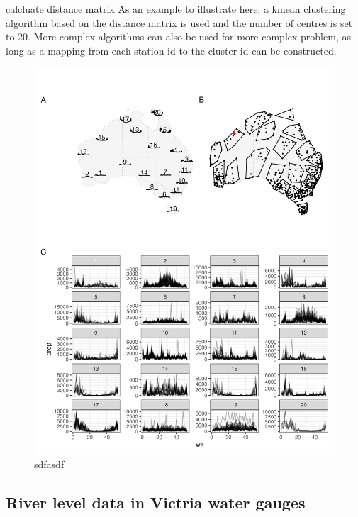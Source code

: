 \documentclass[
]{jss}
\begin{document}
calcluate distance matrix As an example to illustrate here, a kmean
clustering algorithm based on the distance matrix is used and the number
of centres is set to 20. More complex algorithms can also be used for
more complex problem, as long as a mapping from each station id to the
cluster id can be constructed.

\begin{CodeChunk}
\begin{figure}

{\centering \includegraphics[width=1\linewidth,height=0.9\textheight]{figures/basic-agg} 

}

\caption[sdfasdf]{sdfasdf}\label{fig:basic-agg}
\end{figure}
\end{CodeChunk}

\hypertarget{river-level-data-in-victria-water-gauges}{%
\subsection{River level data in Victria water
gauges}\label{river-level-data-in-victria-water-gauges}}
\end{document}
